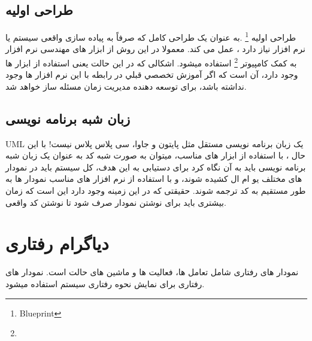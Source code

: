\documentclass[22pt, a4]{article}
\begin{document}
\subsection{طراحی اولیه}
طراحی اولیه
\footnote{Blueprint}
  .به عنوان یک طراحی کامل که صرفاً به پیاده سازی واقعی سیستم یا نرم افزار نیاز دارد ، عمل می کند.
معمولا در این روش از ابزار های مهندسی نرم افزار به کمک کامپیوتر 
\footnote{}
استفاده میشود.
اشکالی که در این حالت یعنی استفاده از ابزار ها وجود دارد، آن است که اگر آموزش
تخصصي قبلي در رابطه با اين نرم افزار ها وجود نداشته باشد، برای توسعه دهنده مدیریت
زمان مسئله ساز خواهد شد.

\subsection{زبان شبه برنامه نویسی }
UML
یک زبان برنامه نویسی مستقل مثل پایتون و جاوا، سی پلاس پلاس نیست!
با این حال ، با استفاده از ابزار های مناسب، میتوان به صورت شبه کد به عنوان یک زبان شبه برنامه نویسی باید به آن نگاه کرد
برای دستیابی به این هدف، کل سیستم باید در نمودار های مختلف یو ام ال کشیده شوند، و با 
استفاده از نرم افزار های مناسب نمودار ها به طور مستقیم به کد ترجمه شوند.
حقیقتی که در این زمینه وجود دارد این است که زمان بیشتری باید برای نوشتن نمودار صرف شود تا نوشتن کد واقعی.




\newpage

\section{دیاگرام رفتاری}
نمودار های رفتاری شامل تعامل ها، فعالیت ها و ماشین های حالت است. نمودار های رفتاری
برای نمایش نحوه رفتاری سیستم استفاده میشود.
\end{document}
